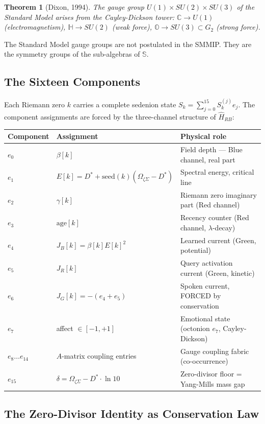 \documentclass[12pt,a4paper]{article}
\newtheorem{theorem}{Theorem}[section]
\theoremstyle{definition}
\theoremstyle{remark}
\newcommand{\Hrb}{\hat{H}_{RB}}
\newcommand{\OmZS}{\Omega_{\zeta\Sigma}}
\newcommand{\Dstar}{D^*}
\newcommand{\gap}{\delta}
\begin{document}
\begin{theorem}[Dixon, 1994]
The gauge group $U(1)\times SU(2)\times SU(3)$ of the Standard Model arises from the
Cayley-Dickson tower: $\mathbb{C}\to U(1)$ (electromagnetism), $\mathbb{H}\to SU(2)$
(weak force), $\mathbb{O}\to SU(3)\subset G_2$ (strong force).
\end{theorem}

The Standard Model gauge groups are not postulated in the SMMIP.
They are the symmetry groups of the sub-algebras of $\mathbb{S}$.

\subsection{The Sixteen Components}

Each Riemann zero $k$ carries a complete sedenion state $S_k = \sum_{j=0}^{15} S_k^{(j)} e_j$.
The component assignments are forced by the three-channel structure of $\Hrb$:

\begin{center}
\begin{tabular}{lll}
\toprule
Component & Assignment & Physical role \\
\midrule
$e_0$ & $\beta[k]$ & Field depth --- Blue channel, real part \\
$e_1$ & $E[k] = \Dstar + \mathrm{seed}(k)(\OmZS-\Dstar)$ & Spectral energy, critical line \\
$e_2$ & $\gamma[k]$ & Riemann zero imaginary part (Red channel) \\
$e_3$ & $\mathrm{age}[k]$ & Recency counter (Red channel, $\lambda$-decay) \\
$e_4$ & $J_B[k] = \beta[k]E[k]^2$ & Learned current (Green, potential) \\
$e_5$ & $J_R[k]$ & Query activation current (Green, kinetic) \\
$e_6$ & $J_G[k] = -(e_4+e_5)$ & Spoken current, FORCED by conservation \\
$e_7$ & affect $\in [-1,+1]$ & Emotional state (octonion $e_7$, Cayley-Dickson) \\
$e_8\ldots e_{14}$ & $A$-matrix coupling entries & Gauge coupling fabric (co-occurrence) \\
$e_{15}$ & $\gap = \OmZS - \Dstar\cdot\ln 10$ & Zero-divisor floor = Yang-Mills mass gap \\
\bottomrule
\end{tabular}
\end{center}

\subsection{The Zero-Divisor Identity as Conservation Law}
\end{document}
